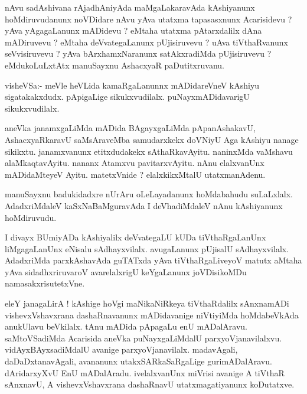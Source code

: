 \documentclass{article}
\begin{document}
\begin{mn}%
nAvu sadAshivana rAjadhAniyAda maMgaLakaravAda kAshiyanunx hoMdiruvudanunx noVDidare nAvu 
yAva utatxma tapasasxnunx Acarisidevu ? yAva yAgagaLanunx mADidevu ? eMtaha utatxma 
pAtarxdalilx dAna mADiruvevu ? eMtaha deVvategaLanunx pUjisiruvevu ? uAva tiVthaRvanunx 
seVvisiruvevu ? yAva bArxhamxNaranunx satAkxradiMda pUjisiruvevu ? eMdukoLuLxtAtx 
manuSayxnu AshacxyaR paDutitxruvanu.
\end{mn}

\begin{mn}%
visheVSa:- meVle heVLida kamaRgaLanunnx mADidareVneV kAshiyu sigatakakxdudx. pApigaLige 
sikukxvudilalx. puNayxmADidavarigU sikukxvudilalx.
\end{mn}

\begin{mn}%
aneVka janamxgaLiMda mADida BAgayxgaLiMda pApanAshakavU, AshacxyaRkaravU saMsAraveMba 
samudarxkekx doVNiyU Aga kAshiyu nanage sikikxtu. janamxvanunx etitxdudakekx 
sAthaRkavAyitu. naninxMda vaMshavu alaMkaqtavAyitu. nananx Atamxvu pavitarxvAyitu. nAnu 
elalxvanUnx mADidaMteyeV Ayitu. matetxVnide ? elalxkikxMtalU utatxmanAdenu.
\end{mn}

\begin{mn}%
manuSayxnu badukidadxre nUrAru oLeLayadanunx hoMdabahudu suLaLxlalx. AdadxriMdaleV 
kaSxNaBaMguravAda I deVhadiMdaleV nAnu kAshiyanunx hoMdiruvudu.
\end{mn}

\begin{mn}%
I divayx BUmiyADa kAshiyalilx deVvategaLU kUDa tiVthaRgaLanUnx liMgagaLanUnx eNisalu 
sAdhayxvilalx. avugaLanunx pUjisalU sAdhayxvilalx. AdadxriMda parxkAshavAda guTATxda yAva 
tiVthaRgaLiveyoV matutx aMtaha yAva sidadhxriruvaroV avarelalxrigU keYgaLanunx joVDisikoMDu 
namasakxrisutetxVne.
\end{mn}

\begin{mn}%
eleY janagaLirA ! kAshige hoVgi maNikaNiRkeya tiVthaRdalilx sAnxnamADi vishevxVshavxrana 
dashaRnavanunx mADidavanige niVtiyiMda hoMdabeVkAda anukUlavu beVkilalx. tAnu mADida 
pApagaLu enU mADalAravu. saMtoVSadiMda Acarisida aneVka puNayxgaLiMdalU 
parxyoVjanavilalxvu. vidAyxBAyxsadiMdalU avanige parxyoVjanavilalx. madavAgali, 
daDaDxtanavAgali, avananunx utakxSARkaSaRgaLige gurimADalAravu. dAridarxyXvU EnU 
mADalAradu. ivelalxvanUnx miVrisi avanige A tiVthaR sAnxnavU, A vishevxVshavxrana 
dashaRnavU utatxmagatiyanunx koDutatxve.
\end{mn}
\end{document}
